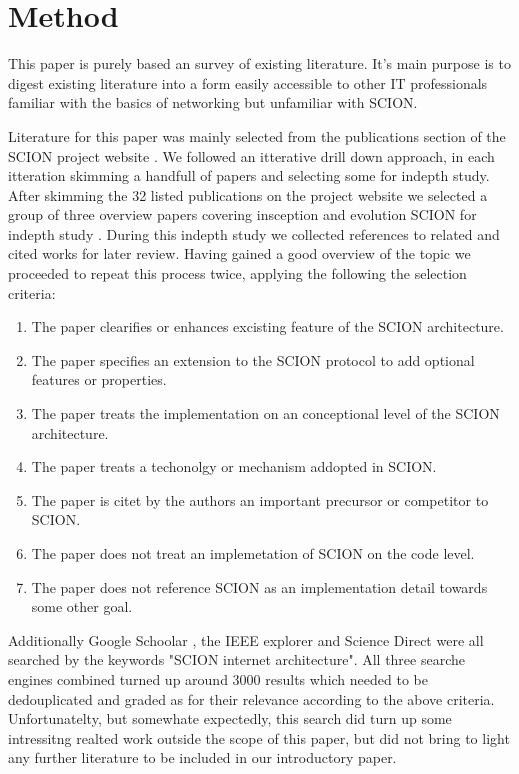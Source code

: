 \documentclass[../eva1_scion.tex]{subfiles}
\begin{document}
    \chapter{Method}\label{ch:method}

   This paper is purely based an survey of existing literature. It's main purpose is to digest existing literature into a form easily accessible to other IT professionals familiar with the basics of networking but unfamiliar with SCION.

   Literature for this paper was mainly selected from the publications section of the SCION project website \cite{scion_website}. We followed an itterative drill down approach, in each itteration skimming a handfull of papers and selecting some for indepth study. After skimming the 32 listed publications on the project website we selected a group of three overview papers covering insception and evolution SCION for indepth study \cite{scion_2011, scion_2015, scion_2017}. During this indepth study we collected references to related and cited works for later review. Having gained a good overview of the topic we proceeded to repeat this process twice, applying the following the selection criteria:

   \begin{enumerate}
       \item The paper clearifies or enhances excisting feature of the SCION architecture.
       \item The paper specifies an extension to the SCION protocol to add optional features or properties.
       \item The paper treats the implementation on an conceptional level of the SCION architecture.
       \item The paper treats a techonolgy or mechanism addopted in SCION.
       \item The paper is citet by the authors an important precursor or competitor to SCION.
       \item The paper does not treat an implemetation of SCION on the code level.
       \item The paper does not reference SCION as an implementation detail towards some other goal.
   \end{enumerate}

   Additionally Google Schoolar \cite{google_scholar}, the IEEE explorer \cite{i3e_explorer} and Science Direct \cite{science_direct} were all searched by the keywords "SCION internet architecture". All three searche engines combined turned up around 3000 results which needed to be dedouplicated and graded as for their relevance according to the above criteria. Unfortunatelty, but somewhate expectedly, this search did turn up some intressitng realted work outside the scope of this paper, but did not bring to light any further literature to be included in our introductory paper.
\end{document}
